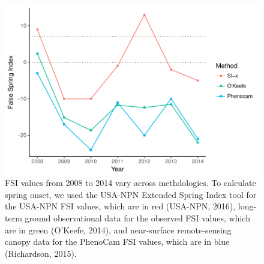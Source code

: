 \documentclass{article}\usepackage[]{graphicx}\usepackage[]{color}
\makeatletter
\def\maxwidth{ %
  \ifdim\Gin@nat@width>\linewidth
    \linewidth
  \else
    \Gin@nat@width
  \fi
}
\newenvironment{kframe}{%
 \def\at@end@of@kframe{}%
 \ifinner\ifhmode%
  \def\at@end@of@kframe{\end{minipage}}%
  \begin{minipage}{\columnwidth}%
 \fi\fi%
 \def\FrameCommand##1{\hskip\@totalleftmargin \hskip-\fboxsep
 \colorbox{shadecolor}{##1}\hskip-\fboxsep
     \hskip-\linewidth \hskip-\@totalleftmargin \hskip\columnwidth}%
 \MakeFramed {\advance\hsize-\width
   \@totalleftmargin\z@ \linewidth\hsize
   \@setminipage}}%
 {\par\unskip\endMakeFramed%
 \at@end@of@kframe}
\makeatother
\begin{document}
\begin{kframe}


{\ttfamily\noindent\bfseries{}}\end{kframe}\begin{figure}[H]

{\centering \includegraphics[width=\maxwidth]{figure/fsifig-1} 

}

\caption[FSI values from 2008 to 2014 vary across methdologies]{FSI values from 2008 to 2014 vary across methdologies. To calculate spring onset, we used the USA-NPN Extended Spring Index tool for the USA-NPN FSI values, which are in red (USA-NPN, 2016), long-term ground observational data for the observed FSI values, which are in green (O'Keefe, 2014), and near-surface remote-sensing canopy data for the PhenoCam FSI values, which are in blue (Richardson, 2015).}\label{fig:fsifig}
\end{figure}
\end{document}
